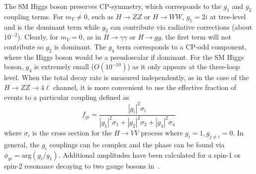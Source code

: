 The SM Higgs boson preserves CP-symmetry, which corresponds to the $g_1$ and $g_2$ coupling terms. For $m_V \neq 0$, such as $H\rightarrow ZZ$ or $H\rightarrow WW$, $g_1=2i$ at tree-level and is the dominant term while $g_2$ can contribute via radiative corrections (about $10^{-2}$). Clearly, for $m_V=0$, as in $H\rightarrow\gamma\gamma$ or $H\rightarrow gg$, the first term will not contribute so $g_2$ is dominant. The $g_4$ term corresponds to a CP-odd component, where the Higgs boson would be a pseudoscalar if dominant. For the SM Higgs boson, $g_4$ is extremely small ($O(10^{-10})$) \cite{Soni:1993} as it only appears at the three-loop level. When the total decay rate is measured independently, as in the case of the $H\rightarrow ZZ \rightarrow 4\ell$ channel, it is more convenient to use the effective fraction of events to a particular coupling defined as
\begin{equation}
f_{gi} = \frac{|g_i|^2\sigma_i}{|g_1|^2\sigma_1 + |g_2|^2\sigma_2 + |g_4|^2\sigma_4}
\label{eqn:fgi_eqn}
\end{equation}
where $\sigma_i$ is the cross section for the $H\rightarrow VV$ process where $g_i=1,g_{j\neq i}=0$. In general, the $g_i$ couplings can be complex and the phase can be found via $\phi_{gi}=\mathrm{arg}{(g_i/g_1)}$. Additional amplitudes have been calculated for a spin-1 or spin-2 resonance decaying to two gauge bosons in~\cite{Gao:2010qx}.

